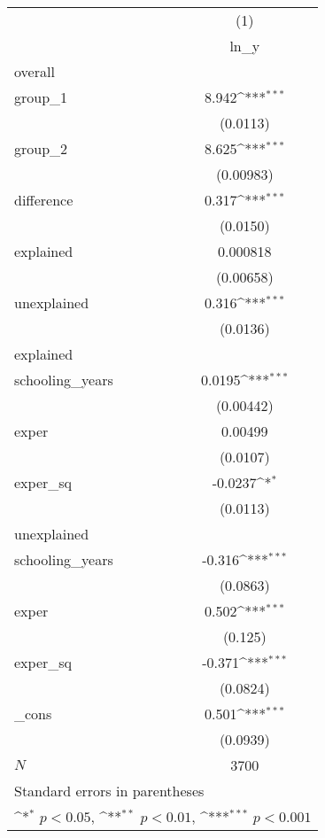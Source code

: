 {
\def\sym#1{\ifmmode^{#1}\else\(^{#1}\)\fi}
\begin{tabular}{l*{1}{c}}
\hline\hline
            &\multicolumn{1}{c}{(1)}\\
            &\multicolumn{1}{c}{ln\_y}\\
\hline
overall     &                     \\
group\_1     &       8.942\sym{***}\\
            &    (0.0113)         \\
[1em]
group\_2     &       8.625\sym{***}\\
            &   (0.00983)         \\
[1em]
difference  &       0.317\sym{***}\\
            &    (0.0150)         \\
[1em]
explained   &    0.000818         \\
            &   (0.00658)         \\
[1em]
unexplained &       0.316\sym{***}\\
            &    (0.0136)         \\
\hline
explained   &                     \\
schooling\_years&      0.0195\sym{***}\\
            &   (0.00442)         \\
[1em]
exper       &     0.00499         \\
            &    (0.0107)         \\
[1em]
exper\_sq    &     -0.0237\sym{*}  \\
            &    (0.0113)         \\
\hline
unexplained &                     \\
schooling\_years&      -0.316\sym{***}\\
            &    (0.0863)         \\
[1em]
exper       &       0.502\sym{***}\\
            &     (0.125)         \\
[1em]
exper\_sq    &      -0.371\sym{***}\\
            &    (0.0824)         \\
[1em]
\_cons      &       0.501\sym{***}\\
            &    (0.0939)         \\
\hline
\(N\)       &        3700         \\
\hline\hline
\multicolumn{2}{l}{\footnotesize Standard errors in parentheses}\\
\multicolumn{2}{l}{\footnotesize \sym{*} \(p<0.05\), \sym{**} \(p<0.01\), \sym{***} \(p<0.001\)}\\
\end{tabular}
}
